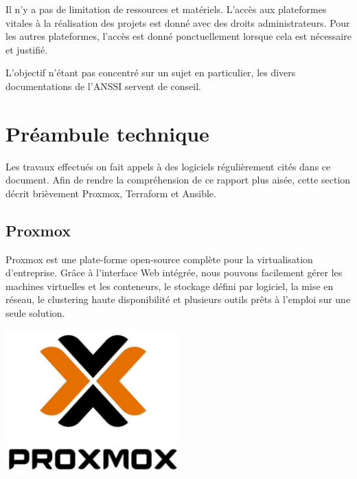 \documentclass[12pt]{article}
\begin{document}
Il n'y a pas de limitation de ressources et matériels.
L'accès aux plateformes vitales à la réalisation des projets est donné avec des droits administrateurs.
Pour les autres plateformes, l'accès est donné ponctuellement lorsque cela est nécessaire et justifié.

L'objectif n'étant pas concentré sur un sujet en particulier, les divers documentations de l'ANSSI servent de conseil.

\newpage
\section{Préambule technique}
\label{sec: preambule_technique}
Les travaux effectués on fait appels à des logiciels régulièrement cités dans ce document. 
Afin de rendre la compréhension de ce rapport plus aisée, cette section décrit brièvement Proxmox, Terraform et Ansible.

\subsection{Proxmox}
\noindent%
\begin{minipage}{.7\textwidth}%
Proxmox est une plate-forme open-source complète pour la virtualisation d'entreprise. 
Grâce à l'interface Web intégrée, nous pouvons facilement gérer les machines virtuelles et les conteneurs, le stockage défini par logiciel, la mise en réseau, le clustering haute disponibilité et plusieurs outils prêts à l'emploi sur une seule solution. \\

\end{minipage}%
\hfill
\begin{minipage}{.3\textwidth}%
\begin{center}
\includegraphics[width=0.5\textwidth]{src/proxmox.JPG}
\end{center}
\end{minipage}%
\end{document}
